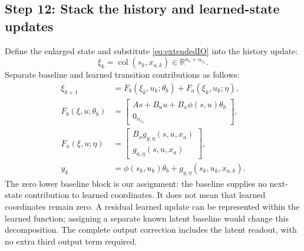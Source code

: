 \documentclass[11pt,a4paper]{article}
\newcommand{\R}{\mathbb R}
\newcommand{\col}{\operatorname{col}}
\begin{document}
\subsection*{Step 12: Stack the history and learned-state updates}
Define the enlarged state and substitute \eqref{eq:extendedIO} into the history update:
\begin{equation}\label{eq:combinedstate}
\xi_k=\col(s_k,x_{a,k})\in\R^{n_s+n_{x_a}}.
\end{equation}
Separate baseline and learned transition contributions as follows:
\begin{equation}\label{eq:extendedSS}
\boxed{\begin{aligned}
\xi_{k+1}&=F_b(\xi_k,u_k;\theta_b)+F_a(\xi_k,u_k;\eta),\\
F_b(\xi,u;\theta_b)&=\begin{bmatrix}As+B_u u+B_x\phi(s,u)\theta_b\\0_{n_{x_a}}\end{bmatrix},\\
F_a(\xi,u;\eta)&=\begin{bmatrix}B_xg_{y,\eta}(s,u,x_a)\\g_{a,\eta}(s,u,x_a)\end{bmatrix},\\
\hat y_k&=\phi(s_k,u_k)\theta_b+g_{y,\eta}(s_k,u_k,x_{a,k}).
\end{aligned}}
\end{equation}
The zero lower baseline block is our assignment: the baseline supplies no next-state contribution to learned coordinates. It does not mean that learned coordinates remain zero. A residual learned update can be represented within the learned function; assigning a separate known latent baseline would change this decomposition. The complete output correction includes the latent readout, with no extra third output term required.
\end{document}
